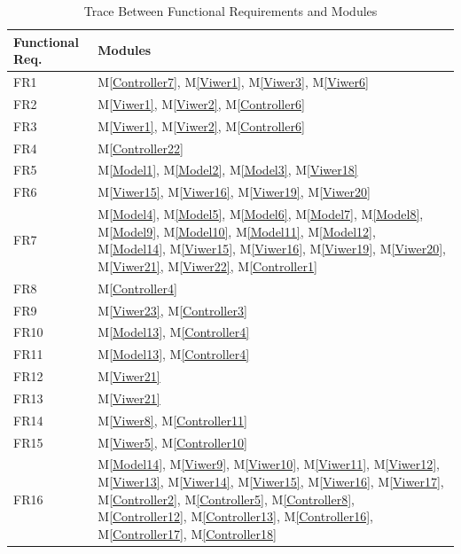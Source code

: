 \documentclass[12pt, titlepage]{article}
\newcommand{\mref}[1]{M\ref{#1}}
\begin{document}
\begin{table}[H]
\caption{Trace Between Functional Requirements and Modules}
\label{TbFRM}

\centering
\begin{tabular}{p{} p{}}
\toprule
\textbf{Functional Req.} & \textbf{Modules}\\
\midrule
FR1 &  \mref{Controller7}, \mref{Viwer1}, \mref{Viwer3}, \mref{Viwer6}\\
FR2 & \mref{Viwer1}, \mref{Viwer2}, \mref{Controller6}\\
FR3 & \mref{Viwer1}, \mref{Viwer2}, \mref{Controller6}\\
FR4 & \mref{Controller22}\\
FR5 & \mref{Model1}, \mref{Model2}, \mref{Model3}, \mref{Viwer18}\\
FR6 & \mref{Viwer15}, \mref{Viwer16}, \mref{Viwer19}, \mref{Viwer20}\\
FR7 & \mref{Model4}, \mref{Model5}, \mref{Model6}, \mref{Model7}, \mref{Model8}, 
\mref{Model9}, \mref{Model10}, \mref{Model11}, \mref{Model12}, \mref{Model14}, 
\mref{Viwer15}, \mref{Viwer16}, \mref{Viwer19}, \mref{Viwer20}, \mref{Viwer21}, 
\mref{Viwer22}, \mref{Controller1}\\
FR8 & \mref{Controller4}\\
FR9 & \mref{Viwer23}, \mref{Controller3}\\
FR10 & \mref{Model13}, \mref{Controller4}\\
FR11 & \mref{Model13}, \mref{Controller4}\\
FR12 & \mref{Viwer21}\\
FR13 & \mref{Viwer21}\\
FR14 & \mref{Viwer8}, \mref{Controller11}\\
FR15 & \mref{Viwer5}, \mref{Controller10}\\
FR16 & \mref{Model14}, \mref{Viwer9}, \mref{Viwer10}, \mref{Viwer11}, \mref{Viwer12}, 
\mref{Viwer13}, \mref{Viwer14}, \mref{Viwer15}, \mref{Viwer16}, \mref{Viwer17}, 
\mref{Controller2}, \mref{Controller5}, \mref{Controller8}, \mref{Controller12},
\mref{Controller13}, \mref{Controller16}, \mref{Controller17}, \mref{Controller18}\\
\bottomrule
\end{tabular}
\end{table}

\newpage

\newcommand{\ALLM}{All the modules (Please check Table \ref{TblModels}, \ref{TblViewers1}, 
\ref{TblViewers2}, and \ref{TblControllers}).}
\end{document}
